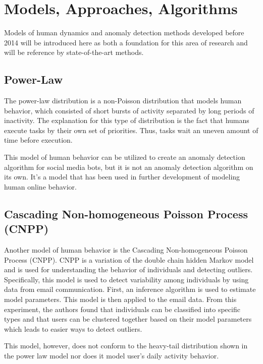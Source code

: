 \documentclass[11pt, oneside]{article}   	%
\begin{document}
\section{Models, Approaches, Algorithms} \label{found_models}

\quad Models of human dynamics and anomaly detection methods  developed before 2014 will be introduced here as both a foundation for this area of research and will be reference by state-of-the-art methods. 

\subsection*{Power-Law }

\quad The power-law distribution \cite{powerlaw} is a non-Poisson distribution that models human behavior, which consisted of short bursts of activity separated by long periods of inactivity.
The explanation for this type of distribution is the fact that humans execute tasks by their own set of priorities.
Thus, tasks wait an uneven amount of time before execution. 

\quad This model of human behavior can be utilized to create an anomaly detection algorithm for social media bots, but it is not an anomaly detection algorithm on its own. It's a model that has been used in further development of modeling human online behavior.

\subsection*{Cascading Non-homogeneous Poisson Process (CNPP) }

\quad Another model of human behavior is the Cascading Non-homogeneous Poisson Process (CNPP). CNPP is a variation of the double chain hidden Markov model and is used for understanding the behavior of individuals and detecting outliers.
Specifically, this model is used to detect variability among individuals by using data from email communication.
First, an inference algorithm is used to estimate model parameters. 
This model is then applied to the email data.
From this experiment, the authors found that individuals can be classified into specific types and that users can be clustered together based on their model parameters which leads to easier ways to detect outliers.

\quad This model, however, does not conform to the heavy-tail distribution shown in the power law model nor does it model user's daily activity behavior.
\end{document}
